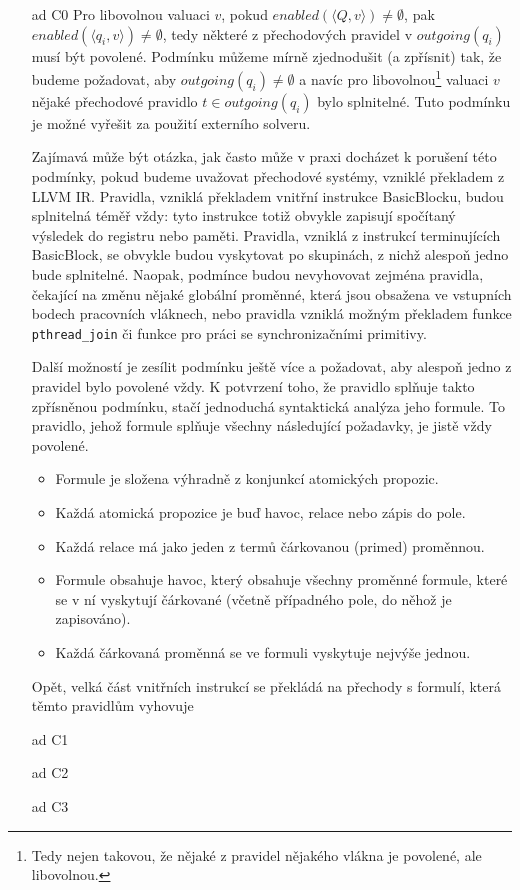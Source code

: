 \documentclass{fithesis2}
\newcommand{\tuple}[1]{\langle #1 \rangle}
\begin{document}
\begin{enumerate}
	\item[ad C0] Pro libovolnou valuaci $v$, pokud $\mathit{enabled}(\tuple{Q,v}) \neq \emptyset$, pak $\mathit{enabled}(\tuple{q_i,v}) \neq \emptyset$, tedy některé z přechodových pravidel v $\mathit{outgoing}(q_i)$ musí být povolené. Podmínku můžeme mírně zjednodušit (a zpřísnit) tak, že budeme požadovat, aby $\mathit{outgoing}(q_i) \neq \emptyset$ a navíc pro libovolnou\footnote{Tedy nejen takovou, že nějaké z pravidel nějakého vlákna je povolené, ale libovolnou.} valuaci $v$ nějaké přechodové pravidlo $t \in \mathit{outgoing}(q_i)$ bylo splnitelné. Tuto podmínku je možné vyřešit za použití externího solveru.

	Zajímavá může být otázka, jak často může v praxi docházet k porušení této podmínky, pokud budeme uvažovat přechodové systémy, vzniklé překladem z LLVM IR. Pravidla, vzniklá překladem vnitřní instrukce BasicBlocku, budou splnitelná téměř vždy: tyto instrukce totiž obvykle zapisují spočítaný výsledek do registru nebo paměti. Pravidla, vzniklá z instrukcí terminujících BasicBlock, se obvykle budou vyskytovat po skupinách, z nichž alespoň jedno bude splnitelné. Naopak, podmínce budou nevyhovovat zejména pravidla, čekající na změnu nějaké globální proměnné, která jsou obsažena ve vstupních bodech pracovních vláknech, nebo pravidla vzniklá možným překladem funkce \texttt{pthread\_join} či funkce pro práci se synchronizačními primitivy.

	Další možností je zesílit podmínku ještě více a požadovat, aby alespoň jedno z pravidel bylo povolené vždy. K potvrzení toho, že pravidlo splňuje takto zpřísněnou podmínku, stačí jednoduchá syntaktická analýza jeho formule. To pravidlo, jehož formule splňuje všechny následující požadavky, je jistě vždy povolené.
	\begin{itemize}
		\item Formule je složena výhradně z konjunkcí atomických propozic.
		\item Každá atomická propozice je buď havoc, relace nebo zápis do pole.
		\item Každá relace má jako jeden z termů čárkovanou (primed) proměnnou.
		\item Formule obsahuje havoc, který obsahuje všechny proměnné formule, které se v ní vyskytují čárkované (včetně případného pole, do něhož je zapisováno).
		\item Každá čárkovaná proměnná se ve formuli vyskytuje nejvýše jednou.
	\end{itemize}
	Opět, velká část vnitřních instrukcí se překládá na přechody s formulí, která těmto pravidlům vyhovuje

\item[ad C1]

\item[ad C2]

\item[ad C3]

\end{enumerate}
\end{document}
